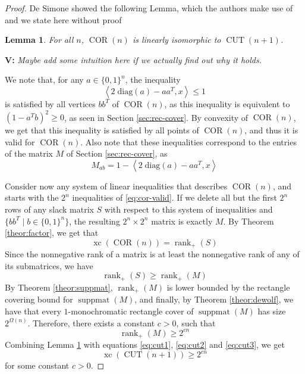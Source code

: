 \documentclass{article}
\newtheorem{lemma}[theorem]{\sc Lemma}
\theoremstyle{definition}
\theoremstyle{remark}
\newcommand{\nrank}{\operatorname{rank}_+}
\newcommand{\suppmat}{\operatorname{suppmat}}
\newcommand{\xc}{\operatorname{xc}}
\newcommand{\CUT}{\operatorname{CUT}}
\newcommand{\COR}{\operatorname{COR}}
\newcommand{\vnote}[1]{{\color{magenta}\noindent\textbf{V: }\marginpar{****}\textit{{#1}}}}
\begin{document}
\begin{proof}
De Simone \cite{de-simone} showed the following Lemma, which the authors make use of and we state here without proof

\begin{lemma}\label{lem:cut-cor}
For all $n$, $\COR(n)$ is linearly isomorphic to $\CUT(n+1)$.
\end{lemma}

\vnote{Maybe add some intuition here if we actually find out why it holds.}

We note that, for any $a \in {\{0, 1\}}^n$, the inequality
\begin{equation}\label{eq:cor-valid}
\left\langle 2 \; \text{diag}(a) - aa^T, x \right\rangle \leq 1
\end{equation}
is satisfied by all vertices $bb^T$ of $\COR(n)$, as this inequality is equivalent to ${(1 - a^Tb)}^2 \geq 0$, as seen in Section \ref{sec:rec-cover}. By convexity of $\COR(n)$, we get that this inequality is satisfied by all points of $\COR(n)$, and thus it is valid for $\COR(n)$. Also note that these inequalities correspond to the entries of the matrix $M$ of Section \ref{sec:rec-cover}, as
\[
M_{ab} = 1 - \left\langle 2 \; \text{diag}(a) - aa^T, x \right\rangle
\]

Consider now any system of linear inequalities that describes $\COR(n)$, and starts with the $2^n$ inequalities of \eqref{eq:cor-valid}. If we delete all but the first $2^n$ rows of any slack matrix $S$ with respect to this system of inequalities and $\{bb^T \mid b \in {\{0, 1\}}^n \}$, the resulting $2^n \times 2^n$ matrix is exactly $M$. By Theorem \ref{theor:factor}, we get that
\begin{equation}\label{eq:cut1}
\xc(\COR(n)) = \nrank(S)
\end{equation}
Since the nonnegative rank of a matrix is at least the nonnegative rank of any of its submatrices, we have
\begin{equation}\label{eq:cut2}
\nrank(S) \geq \nrank(M)
\end{equation}
By Theorem \ref{theor:suppmat}, $\nrank(M)$ is lower bounded by the rectangle covering bound for $\suppmat(M)$, and finally, by Theorem \ref{theor:dewolf}, we have that every $1$-monochromatic rectangle cover of $\suppmat(M)$ has size $2^{\Omega(n)}$. Therefore, there exists a constant $c > 0$, such that
\begin{equation}\label{eq:cut3}
\nrank(M) \geq 2^{cn}
\end{equation}
Combining Lemma \ref{lem:cut-cor} with equations \eqref{eq:cut1}, \eqref{eq:cut2} and \eqref{eq:cut3}, we get
\[
\xc(\CUT(n+1)) \geq 2^{cn}
\]
for some constant $c > 0$.
\end{proof}
\end{document}
